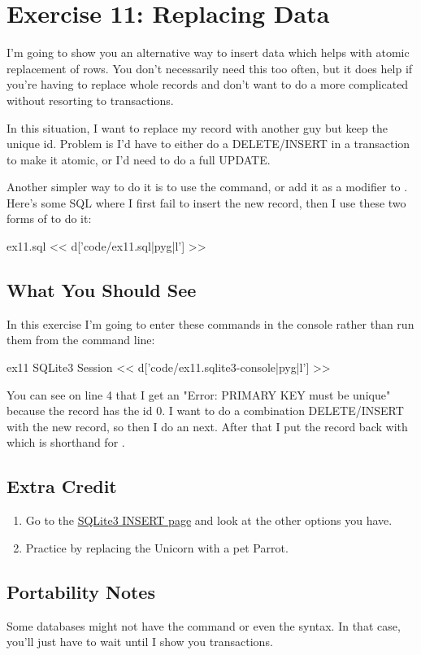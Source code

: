 \chapter{Exercise 11: Replacing Data}

I'm going to show you an alternative way to insert data which helps with
atomic replacement of rows.  You don't necessarily need this too often, but
it does help if you're having to replace whole records and don't want to
do a more complicated  without resorting to transactions.

In this situation, I want to replace my record with another guy but
keep the unique id.  Problem is I'd have to either do a DELETE/INSERT
in a transaction to make it atomic, or I'd need to do a full UPDATE.

Another simpler way to do it is to use the  command, or
add it as a modifier to .  Here's some SQL where I first
fail to insert the new record, then I use these two forms of 
to do it:

\begin{code}{ex11.sql}
<< d['code/ex11.sql|pyg|l'] >>
\end{code}


\section{What You Should See}

In this exercise I'm going to enter these commands in the  
console rather than run them from the command line:

\begin{code}{ex11 SQLite3 Session}
<< d['code/ex11.sqlite3-console|pyg|l'] >>
\end{code}

You can see on line 4 that I get an "Error: PRIMARY KEY must be unique"
because the record has the id 0.  I want to do a combination DELETE/INSERT
with the new record, so then I do an  next.
After that I put the record back with  which is shorthand for
.

\section{Extra Credit}

\begin{enumerate}
\item Go to the \href{http://www.sqlite.org/lang_insert.html}{SQLite3 INSERT page} and look at the other  options you have.
\item Practice  by replacing the Unicorn with a pet Parrot.
\end{enumerate}

\section{Portability Notes}

Some databases might not have the  command or even the 
 syntax.  In that case, you'll just have to wait
until I show you transactions.
